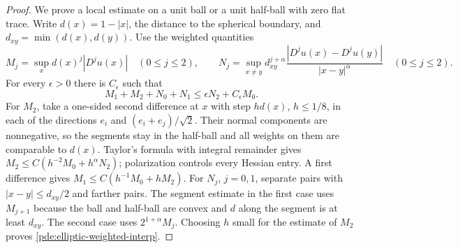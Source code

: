 \documentclass[11pt,oneside,openany]{book}
\theoremstyle{plain}
\theoremstyle{definition}
\theoremstyle{remark}
\begin{document}
\begin{proof}
We prove a local estimate on a unit ball or a unit half-ball
with zero flat trace. Write \(d(x)=1-|x|\), the distance to
the spherical boundary, and \(d_{xy}=\min(d(x),d(y))\).
Use the weighted quantities
\[
 M_j=\sup_x d(x)^j|D^j u(x)|\quad(0\leq j\leq2),\qquad
 N_j=\sup_{x\ne y}d_{xy}^{j+\alpha}
       \frac{|D^ju(x)-D^ju(y)|}{|x-y|^\alpha}\quad(0\leq j\leq2).
\]
For every \(\epsilon>0\) there is \(C_\epsilon\) such that
\[
 M_1+M_2+N_0+N_1\leq \epsilon N_2+C_\epsilon M_0.
 \tag{*}\label{pde:elliptic-weighted-interp}
\]
For \(M_2\), take a one-sided second difference at \(x\) with
step \(h d(x)\), \(h\leq1/8\), in each of the directions
\(e_i\) and \((e_i+e_j)/\sqrt2\). Their normal components are
nonnegative, so the segments stay in the half-ball and all
weights on them are comparable to \(d(x)\).
Taylor's formula with integral remainder gives
\(M_2\leq C(h^{-2}M_0+h^\alpha N_2)\); polarization
controls every Hessian entry. A first difference gives
\(M_1\leq C(h^{-1}M_0+hM_2)\). For \(N_j\), \(j=0,1\),
separate pairs with \(|x-y|\leq d_{xy}/2\) and farther
pairs. The segment estimate in the first case uses \(M_{j+1}\)
because the ball and half-ball are convex and
\(d\) along the segment is at least \(d_{xy}\).
The second case uses \(2^{1+\alpha}M_j\).
Choosing \(h\) small for the estimate of \(M_2\) proves
\eqref{pde:elliptic-weighted-interp}.


\end{proof}
\end{document}
